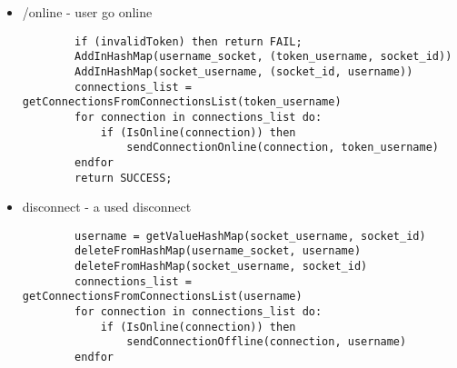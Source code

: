 \begin{itemize}
    \item /online - user go online
    \begin{lstlisting}
        if (invalidToken) then return FAIL;
        AddInHashMap(username_socket, (token_username, socket_id))
        AddInHashMap(socket_username, (socket_id, username))
        connections_list = getConnectionsFromConnectionsList(token_username)
        for connection in connections_list do:
            if (IsOnline(connection)) then
                sendConnectionOnline(connection, token_username)
        endfor
        return SUCCESS;
    \end{lstlisting}
    \item disconnect - a used disconnect
    \begin{lstlisting}
        username = getValueHashMap(socket_username, socket_id)
        deleteFromHashMap(username_socket, username)
        deleteFromHashMap(socket_username, socket_id)
        connections_list = getConnectionsFromConnectionsList(username)
        for connection in connections_list do:
            if (IsOnline(connection)) then
                sendConnectionOffline(connection, username)
        endfor


\end{lstlisting}
\end{itemize}
